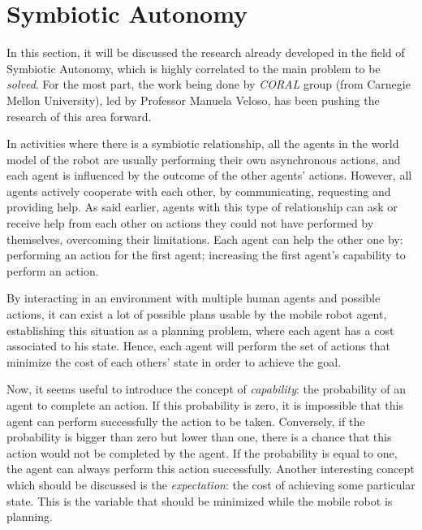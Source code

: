 \newpage

\section{Symbiotic Autonomy}
In this section, it will be discussed the research already developed in the field
of Symbiotic Autonomy, which is highly correlated to the main problem to be
\textit{solved}. For the most part, the work being done by \textit{CORAL}
group (from Carnegie Mellon University), led by Professor Manuela Veloso, has
been pushing the research of this area forward.

In activities where there is a symbiotic relationship, all the agents in the
world model of the robot are usually performing their own asynchronous actions,
and each agent is influenced by the outcome of the other agents' actions.
However, all agents actively cooperate with each other, by communicating,
requesting and providing help.
As said earlier, agents with this type of relationship can ask or receive help
from each other on actions they could not have performed by themselves,
overcoming their limitations. Each agent can help the other one by: performing
an action for the first agent; increasing the first agent's capability to
perform an action.

By interacting in an environment with multiple human agents and possible
actions, it can exist a lot of possible plans usable by the mobile robot agent,
establishing this situation as a planning problem, where each agent has a cost
associated to his state. Hence, each agent will perform the set of actions that
minimize the cost of each others' state in order to achieve the goal.

Now, it seems useful to introduce the concept of \textit{capability}: the
probability of an agent to complete an action. If this probability is zero, it
is impossible that this agent can perform successfully the action to be taken.
Conversely, if the probability is bigger than zero but lower than one, there is
a chance that this action would not be completed by the agent. If the
probability is equal to one, the agent can always perform this action
successfully. Another interesting concept which should be discussed is the
\textit{expectation}: the cost of achieving some particular state. This is the
variable that should be minimized while the mobile robot is planning.

